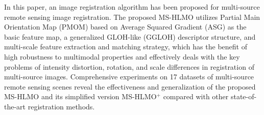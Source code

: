 In this paper, an image registration algorithm has been proposed for multi-source remote sensing image registration. The proposed MS-HLMO utilizes Partial Main Orientation Map (PMOM) based on Average Squared Gradient (ASG) as the basic feature map, a generalized GLOH-like (GGLOH) descriptor structure, and multi-scale feature extraction and matching strategy, which has the benefit of high robustness to multimodal properties and effectively deals with the key problems of intensity distortion, rotation, and scale differences in registration of multi-source images. Comprehensive experiments on 17 datasets of multi-source remote sensing scenes reveal the effectiveness and generalization of the proposed MS-HLMO and its simplified version MS-HLMO$^+$ compared with other state-of-the-art registration methods. 